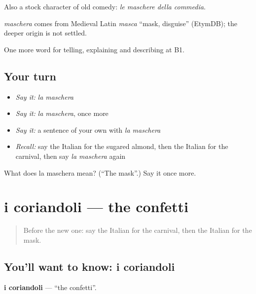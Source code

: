 Also a stock character of old comedy: \emph{le maschere della commedia}.

\begin{cousinweb}
\emph{maschera} comes from Medieval Latin \emph{masca} \textquotedblleft{}mask, disguise\textquotedblright{} (EtymDB); the deeper origin is not settled.
\end{cousinweb}

\begin{grammarlens}[title={What you've built}]
One more word for telling, explaining and describing at B1.
\end{grammarlens}

\subsection*{Your turn}
\begin{itemize}
\raggedright
  \item \emph{Say it:} \emph{la maschera}
  \item \emph{Say it:} \emph{la maschera}, once more
  \item \emph{Say it:} a sentence of your own with \emph{la maschera}
  \item \emph{Recall:} say the Italian for the sugared almond, then the Italian for the carnival, then say \emph{la maschera} again
\end{itemize}

\begin{tcolorbox}[breakable,colback=teal!4,colframe=teal!35!black,title={Before you move on}]
What does la maschera mean? (\textquotedblleft{}The mask\textquotedblright{}.) Say it once more.
\end{tcolorbox}
\section[i coriandoli]{i coriandoli — the confetti}

\label{lesson:IT-C319-coriandoli}



\begin{quote}
Before the new one: say the Italian for the carnival, then the Italian for the mask.
\end{quote}

\subsection*{You'll want to know: i coriandoli}
\textbf{i coriandoli} — \textquotedblleft{}the confetti\textquotedblright{}.

